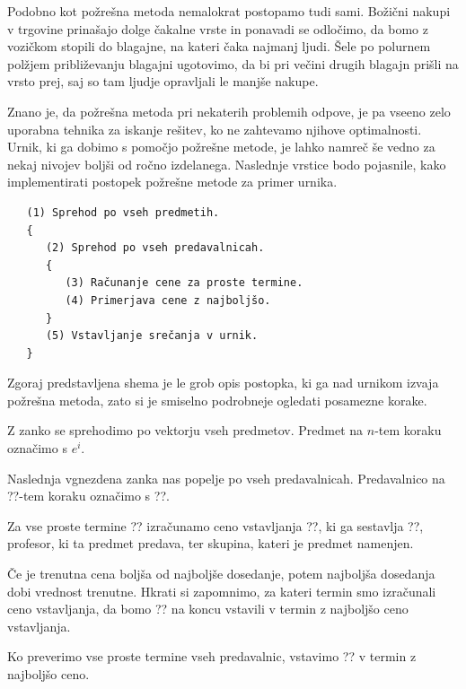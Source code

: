\documentclass[a4paper]{article}
\begin{document}
Podobno kot požrešna metoda nemalokrat postopamo tudi sami. Božični nakupi v trgovine
prinašajo dolge čakalne vrste in ponavadi se odločimo, da bomo z vozičkom stopili do blagajne,
na kateri čaka najmanj ljudi. Šele po polurnem polžjem približevanju blagajni ugotovimo,
da bi pri večini drugih blagajn prišli na vrsto prej, saj so tam ljudje opravljali le
manjše nakupe.

Znano je, da požrešna metoda pri nekaterih problemih odpove, je pa vseeno zelo uporabna
tehnika za iskanje rešitev, ko ne zahtevamo njihove optimalnosti. Urnik, ki ga dobimo s
pomočjo požrešne metode, je lahko namreč še vedno za nekaj nivojev boljši od ročno izdelanega.
Naslednje vrstice bodo pojasnile, kako implementirati postopek požrešne metode za primer urnika.


\begin{verbatim}
   (1) Sprehod po vseh predmetih.
   {
      (2) Sprehod po vseh predavalnicah.
      {
         (3) Računanje cene za proste termine.
         (4) Primerjava cene z najboljšo.
      }
      (5) Vstavljanje srečanja v urnik.
   }
\end{verbatim}
%
Zgoraj predstavljena shema je le grob opis postopka, ki ga nad urnikom izvaja požrešna metoda,
zato si je smiselno podrobneje ogledati posamezne korake.

   Z zanko se sprehodimo po vektorju vseh predmetov. Predmet na $n$-tem koraku
   označimo s $e^{i}$.

   Naslednja vgnezdena zanka nas popelje po vseh predavalnicah. Predavalnico na
   ??-tem koraku označimo s ??.

   Za vse proste termine ?? izračunamo ceno vstavljanja
   ??, ki ga sestavlja ??, profesor, ki ta predmet predava,
   ter skupina, kateri je predmet namenjen.

   Če je trenutna cena boljša od najboljše dosedanje, potem najboljša dosedanja
   dobi vrednost trenutne. Hkrati si zapomnimo, za kateri termin smo izračunali ceno
   vstavljanja, da bomo ?? na koncu vstavili v termin z najboljšo
   ceno vstavljanja.

   Ko preverimo vse proste termine vseh predavalnic, vstavimo ??
   v termin z najboljšo ceno.
\end{document}
